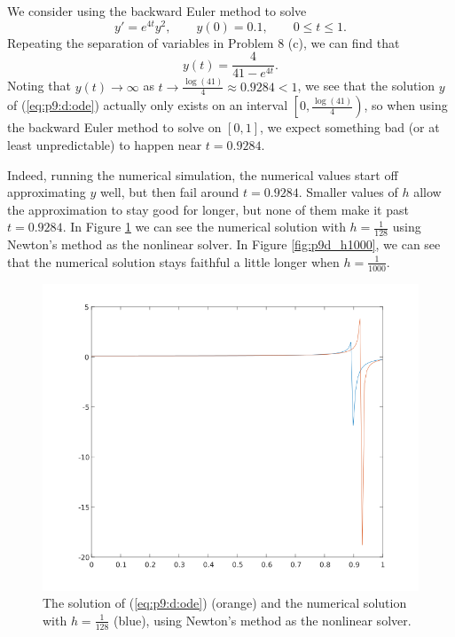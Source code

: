 \documentclass{homework}
\begin{document}
\begin{alphaparts}
			\questionpart We consider using the backward Euler method to solve
			\begin{equation}
				\label{eq:p9:d:ode}
				y' = e^{4t}y^2, \qquad y(0) = 0.1, \qquad 0\le t\le 1.
			\end{equation}
			Repeating the separation of variables in Problem 8 (c), we can find that
			\begin{equation}
				y(t) = \frac{4}{41 - e^{4t}}.
			\end{equation}
			Noting that $y(t) \to\infty$ as $t\to \frac{\log(41)}{4} \approx 0.9284 < 1$, we see that the solution $y$ of (\ref{eq:p9:d:ode}) actually only exists on an interval $\left[0, \frac{\log(41)}{4}\right)$, so when using the backward Euler method to solve on $[0,1]$, we expect something bad (or at least unpredictable) to happen near $t = 0.9284$.
			
			Indeed, running the numerical simulation, the numerical values start off approximating $y$ well, but then fail around $t = 0.9284$. Smaller values of $h$ allow the approximation to stay good for longer, but none of them make it past $t = 0.9284$. In Figure \ref{fig:p9d_h128} we can see the numerical solution with $h=\frac{1}{128}$ using Newton's method as the nonlinear solver. In Figure \ref{fig:p9d_h1000}, we can see that the numerical solution stays faithful a little longer when $h = \frac{1}{1000}$.
			
			\begin{figure}[H]
				\centering
				\includegraphics[width=\linewidth]{plot_p9d_h128.png}
				\caption{The solution of (\ref{eq:p9:d:ode}) (orange) and the numerical solution with $h=\frac{1}{128}$ (blue), using Newton's method as the nonlinear solver.}
				\label{fig:p9d_h128}
			\end{figure}
			

\end{alphaparts}
\end{document}
